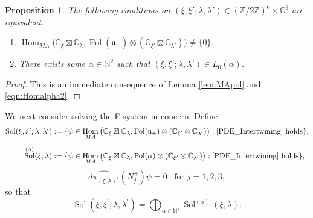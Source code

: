 \documentclass[a4paper,11pt,reqno]{amsart}
\newcommand{\frakn}{\mathfrak{n}}
\newcommand{\CC}{\mathbb{C}}
\newcommand{\NN}{\mathbb{N}}
\newcommand{\ZZ}{\mathbb{Z}}
\newcommand{\0}{{\bf 0}}
\newcommand{\1}{{\bf 1}}
\DeclareMathOperator{\Hom}{Hom}
\DeclareMathOperator{\Pol}{Pol}
\DeclareMathOperator{\Sol}{Sol}
\theoremstyle{plain}
\newtheorem{proposition}[equation]{Proposition}
\theoremstyle{definition}
\numberwithin{equation}{section}
\theoremstyle{definition}
\begin{document}
\begin{proposition}\label{prop:Invariants_Intertwining} 
The following conditions on $(\xi, \xi'; \lambda, \lambda') \in (\ZZ/2\ZZ)^6\times \CC^6$ are equivalent.
\begin{enumerate}[label=\normalfont{(\roman*)}]
    \item $\Hom_{MA}\big(\CC_\xi\boxtimes \CC_{\lambda}, \Pol(\frakn_+)\otimes (\CC_{\xi'}\boxtimes \CC_{\lambda'})\big)\neq \{0\}$.
    \item There exists some $\alpha\in \NN^2$ such that 
    $(\xi,\xi';\lambda,\lambda')\in L_0(\alpha)$.
\end{enumerate}
\end{proposition}

\begin{proof}
This is an immediate consequence 
of Lemma \ref{lem:MApol} and \eqref{eqn:Homalpha2}.
\end{proof}

We next consider solving the F-system in concern.
Define
\begin{align}
\Sol(\xi, \xi^\prime; \lambda, \lambda^\prime) 
&:= \{ \psi \in \Hom_{MA}\big(\CC_\xi\boxtimes\CC_{\lambda}, \Pol(\frakn_+)\otimes (\CC_{\xi'}\otimes \CC_{\lambda'})\big) : \eqref{PDE_Intertwining} \text{ holds}\},
\nonumber\\[5pt]
\Sol^{(\alpha)}(\xi,\lambda) &:= \{ \psi \in \Hom_{MA}\big(\CC_\xi\boxtimes\CC_{\lambda}, \Pol(\alpha)\otimes (\CC_{\xi'}\otimes \CC_{\lambda'})\big) : \eqref{PDE_Intertwining} \text{ holds}\},
\label{SolSpace_zeta_Int}
\end{align}
\begin{equation}\label{PDE_Intertwining}
\widehat{d\pi_{(\xi,\lambda)^*}}(N_{j}^+)\psi = 0 \enspace \text{ for } j = 1, 2, 3,
\end{equation}
so that 
\begin{equation*}
\Sol(\xi, \xi^\prime; \lambda, \lambda^\prime) 
=\bigoplus_{\alpha \in \NN^2} \Sol^{(\alpha)}(\xi,\lambda).
\end{equation*}
\end{document}
